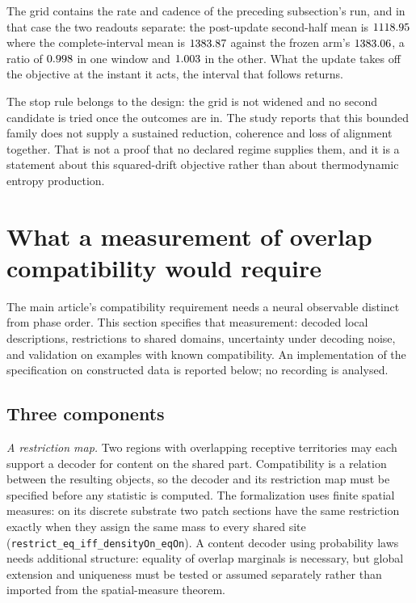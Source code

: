 \documentclass{article}
\begin{document}
The grid contains the rate and cadence of the preceding subsection's run, and
in that case the two readouts separate: the post-update second-half mean is
$1118.95$ where the complete-interval mean is
$1383.87$ against the frozen arm's
$1383.06$, a ratio of
$0.998$ in one window and
$1.003$ in the other. What the update takes off the
objective at the instant it acts, the interval that follows returns.

The stop rule belongs to the design: the grid is not widened and no second
candidate is tried once the outcomes are in. The study reports that this
bounded family does not supply a sustained reduction, coherence and loss of
alignment together. That is not a proof that no declared regime supplies them,
and it is a statement about this squared-drift objective rather than about
thermodynamic entropy production.

\section{What a measurement of overlap compatibility would require}
\label{sec:supp-overlap-test}
\label{sec:compatibility-protocol}

The main article's compatibility requirement needs a neural observable distinct from phase order. This section specifies that measurement: decoded local descriptions, restrictions to shared domains, uncertainty under decoding noise, and validation on examples with known compatibility. An implementation of the specification on constructed data is reported below; no recording is analysed.

\subsection{Three components}

\emph{A restriction map.} Two regions with overlapping receptive territories may each support a decoder for content on the shared part. Compatibility is a relation between the resulting objects, so the decoder and its restriction map must be specified before any statistic is computed. The formalization uses finite spatial measures: on its discrete substrate two patch sections have the same restriction exactly when they assign the same mass to every shared site (\nolinkurl{restrict_eq_iff_densityOn_eqOn}). A content decoder using probability laws needs additional structure: equality of overlap marginals is necessary, but global extension and uniqueness must be tested or assumed separately rather than imported from the spatial-measure theorem.
\end{document}
